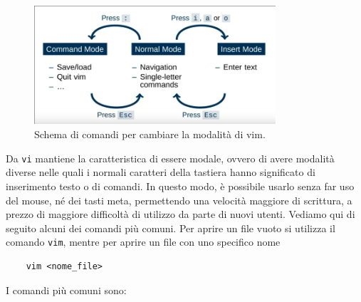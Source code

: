 \begin{figure}
	\centering
	\includegraphics[width=0.8\textwidth]{img/vim_modes.png}
	\caption{Schema di comandi per cambiare la modalità di vim.}
	\label{vim_modes}
\end{figure}
Da \verb*|vi| mantiene la caratteristica di essere modale, ovvero di avere modalità diverse nelle quali i normali caratteri della tastiera hanno significato di inserimento testo o di comandi. In questo modo, è possibile usarlo senza far uso del mouse, né dei tasti meta, permettendo una velocità maggiore di scrittura, a prezzo di maggiore difficoltà di utilizzo da parte di nuovi utenti. Vediamo qui di seguito alcuni dei comandi più comuni. Per aprire un file vuoto si utilizza il comando \verb*|vim|, mentre per aprire un file con uno specifico nome
\begin{verbatim}
	vim <nome_file>
\end{verbatim}
 I comandi più comuni sono:
